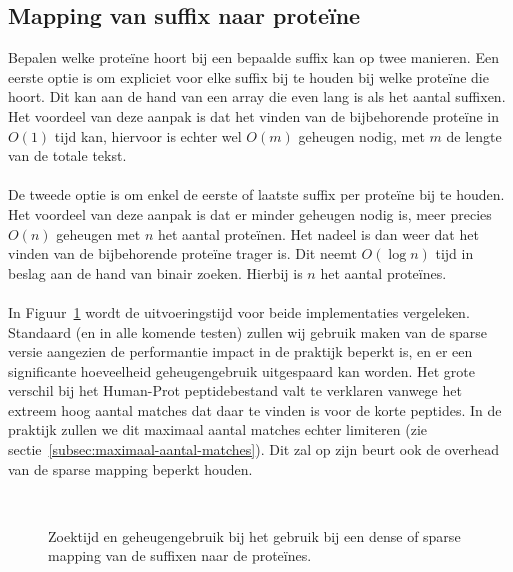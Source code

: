 \subsection{Mapping van suffix naar proteïne}\label{subsec:mapping-van-suffix-naar-proteine}
Bepalen welke proteïne hoort bij een bepaalde suffix kan op twee manieren.
Een eerste optie is om expliciet voor elke suffix bij te houden bij welke proteïne die hoort.
Dit kan aan de hand van een array die even lang is als het aantal suffixen.
Het voordeel van deze aanpak is dat het vinden van de bijbehorende proteïne in $O(1)$ tijd kan, hiervoor is echter wel $O(m)$ geheugen nodig, met $m$ de lengte van de totale tekst.
\\ \\
De tweede optie is om enkel de eerste of laatste suffix per proteïne bij te houden.
Het voordeel van deze aanpak is dat er minder geheugen nodig is, meer precies $O(n)$ geheugen met $n$ het aantal proteïnen.
Het nadeel is dan weer dat het vinden van de bijbehorende proteïne trager is.
Dit neemt $O(\log n)$ tijd in beslag aan de hand van binair zoeken.
Hierbij is $n$ het aantal proteïnes.
\\ \\
In Figuur~\ref{fig:dense_vs_sparse} wordt de uitvoeringstijd voor beide implementaties vergeleken.
Standaard (en in alle komende testen) zullen wij gebruik maken van de sparse versie aangezien de performantie impact in de praktijk beperkt is, en er een significante hoeveelheid geheugengebruik uitgespaard kan worden.
Het grote verschil bij het Human-Prot peptidebestand valt te verklaren vanwege het extreem hoog aantal matches dat daar te vinden is voor de korte peptides.
In de praktijk zullen we dit maximaal aantal matches echter limiteren (zie sectie~\ref{subsec:maximaal-aantal-matches}).
Dit zal op zijn beurt ook de overhead van de sparse mapping beperkt houden.
\begin{figure}[H]
    \centering
    \\[4ex] %

    \caption{Zoektijd en geheugengebruik bij het gebruik bij een dense of sparse mapping van de suffixen naar de proteïnes.}\label{fig:dense_vs_sparse}
\end{figure}


